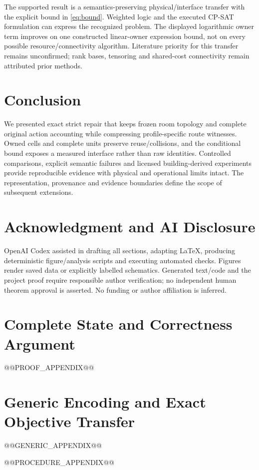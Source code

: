 \documentclass[conference]{IEEEtran}
\begin{document}
The supported result is a semantics-preserving physical/interface transfer with the explicit bound in \eqref{eq:bound}. Weighted logic and the executed CP-SAT formulation can express the recognized problem. The displayed logarithmic owner term improves on one constructed linear-owner expression bound, not on every possible resource/connectivity algorithm. Literature priority for this transfer remains unconfirmed; rank bases, tensoring and shared-cost connectivity remain attributed prior methods.

\section{Conclusion}
We presented exact strict repair that keeps frozen room topology and complete original action accounting while compressing profile-specific route witnesses. Owned cells and complete units preserve reuse/collisions, and the conditional bound exposes a measured interface rather than raw identities. Controlled comparisons, explicit semantic failures and licensed building-derived experiments provide reproducible evidence with physical and operational limits intact. The representation, provenance and evidence boundaries define the scope of subsequent extensions.

\section*{Acknowledgment and AI Disclosure}
OpenAI Codex assisted in drafting all sections, adapting LaTeX, producing deterministic figure/analysis scripts and executing automated checks. Figures render saved data or explicitly labelled schematics. Generated text/code and the project proof require responsible author verification; no independent human theorem approval is asserted. No funding or author affiliation is inferred.

\appendices
\section{Complete State and Correctness Argument}\label{app:proof}
@@PROOF_APPENDIX@@

\section{Generic Encoding and Exact Objective Transfer}\label{app:generic}
@@GENERIC_APPENDIX@@

@@PROCEDURE_APPENDIX@@
\end{document}
